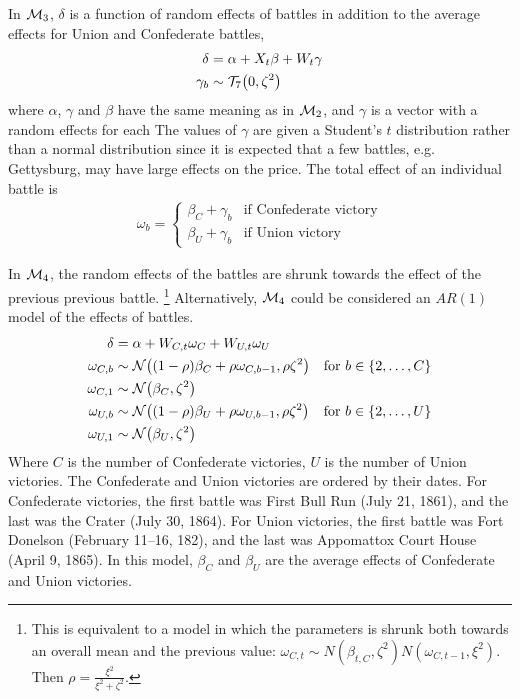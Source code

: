In $\mathcal{M}_{\text{3}}$, $\delta$ is a function of random effects of battles in addition to the average effects for Union and Confederate battles,
\begin{align}
  \label{bonds:eq:10}
  \delta &= \alpha + X_{t} \beta + W_{t} \gamma \\
  \label{bonds:eq:12}
  \gamma_{b} &\sim \mathcal{T}_{7}\mathopen{}\left(0, \zeta^{2}\right)\mathclose{}
\end{align}
where $\alpha$, $\gamma$ and $\beta$ have the same meaning as in $\mathcal{M}_{\text{2}}$, and $\gamma$ is a vector with a random effects for each
The values of $\gamma$ are given a Student's $t$ distribution rather than a normal distribution since it is expected that a few battles, e.g. Gettysburg, may have large effects on the price.
The total effect of an individual battle is
\begin{align}
  \omega_{b} =
  \begin{cases}
    \beta_{C} + \gamma_{b} & \text{if Confederate victory} \\
    \beta_{U} + \gamma_{b} & \text{if Union victory}
  \end{cases}
\end{align}

In $\mathcal{M}_{\text{4}}$, the random effects of the battles are shrunk towards the effect of the previous previous battle.%
\footnote{
  This is equivalent to a model in which the parameters is shrunk both towards an overall mean and the previous value: $\omega_{C,t} \sim N(\beta_{t,C}, \zeta^{2}) N(\omega_{C,t-1}, \xi^{2})$.
  Then  $\rho = \frac{\xi^{2}}{\xi^{2} + \zeta^{2}}$.
}
Alternatively, $\mathcal{M}_{\text{4}}$ could be considered an $AR(1)$ model of the effects of battles.
\begin{align}
  \label{bonds:eq:11}
  \delta &= \alpha + W_{C,t} \omega_{C} + W_{U,t} \omega_{U} \\
  \omega_{C,b} & \sim \mathcal{N}\mathopen{}\left((1 - \rho) \beta_{C} + \rho \omega_{C,b-1}, \rho \zeta^{2}\right)\mathclose{} & \text{for $b \in \{2, \dots, C\}$} \\
  \omega_{C,1} & \sim \mathcal{N}\mathopen{}\left( \beta_{C}, \zeta^{2}\right)\mathclose{} \\
  \omega_{U,b} & \sim \mathcal{N}\mathopen{}\left((1 - \rho) \beta_{U} + \rho \omega_{U,b-1}, \rho \zeta^{2}\right)\mathclose{} & \text{for $b \in \{2, \dots, U \}$} \\
  \omega_{U,1} & \sim \mathcal{N}\mathopen{}\left( \beta_{U}, \zeta^{2}\right)\mathclose{}
\end{align}
Where $C$ is the number of Confederate victories, $U$ is the number of Union victories.
The Confederate and Union victories are ordered by their dates.
For Confederate victories, the first battle was First Bull Run (July 21, 1861), and the last was the Crater (July 30, 1864).
For Union victories, the first battle was Fort Donelson (February 11--16, 182), and the last was Appomattox Court House (April 9, 1865).
In this model, $\beta_{C}$ and $\beta_{U}$ are the average effects of Confederate and Union victories.

